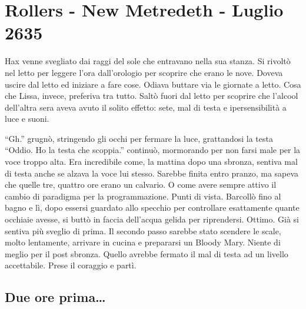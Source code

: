   \section{Rollers - New Metredeth - Luglio 2635}

    Hax venne svegliato dai raggi del sole che entravano nella sua stanza.
    Si rivoltò nel letto per leggere l'ora dall'orologio per scoprire che
    erano le nove. Doveva uscire dal letto ed iniziare a fare cose. Odiava
    buttare via le giornate a letto. Cosa che Lissa, invece, preferiva tra
    tutto. Saltò fuori dal letto per scoprire che l'alcool dell'altra sera
    aveva avuto il solito effetto: sete, mal di testa e ipersensibilità
    a luce e suoni.

    ``Gh.'' grugnò, stringendo gli occhi per fermare la luce, grattandosi
    la testa ``Oddio. Ho la testa che scoppia.'' continuò, mormorando per
    non farsi male per la voce troppo alta. Era incredibile come, la
    mattina dopo una sbronza, sentiva mal di testa anche se alzava la voce
    lui stesso. Sarebbe finita entro pranzo, ma sapeva che quelle tre,
    quattro ore erano un calvario. O come avere sempre attivo il cambio di
    paradigma per la programmazione. Punti di vista. Barcollò fino al bagno
    e lì, dopo essersi guardato allo specchio per controllare esattamente
    quante occhiaie avesse, si buttò in faccia dell'acqua gelida per
    riprendersi. Ottimo. Già si sentiva più sveglio di prima. Il secondo
    passo sarebbe stato scendere le scale, molto lentamente, arrivare in
    cucina e prepararsi un Bloody Mary. Niente di meglio per il post
    sbronza. Quello avrebbe fermato il mal di testa ad un livello
    accettabile. Prese il coraggio e partì.

    \subsection{Due ore prima\dots{}}

